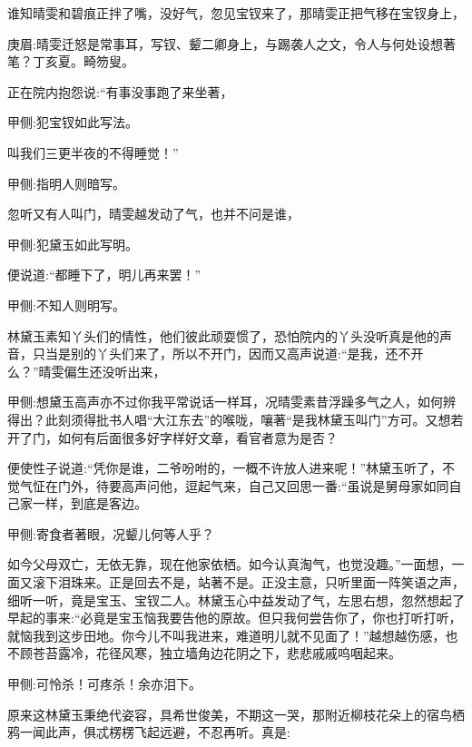 \begin{parag}
    谁知晴雯和碧痕正拌了嘴，没好气，忽见宝钗来了，那晴雯正把气移在宝钗身上，\begin{note}庚眉:晴雯迁怒是常事耳，写钗、颦二卿身上，与踢袭人之文，令人与何处设想著笔？丁亥夏。畸笏叟。\end{note}正在院内抱怨说:“有事没事跑了来坐著，\begin{note}甲侧:犯宝钗如此写法。\end{note}叫我们三更半夜的不得睡觉！”\begin{note}甲侧:指明人则暗写。\end{note}忽听又有人叫门，晴雯越发动了气，也并不问是谁，\begin{note}甲侧:犯黛玉如此写明。\end{note}便说道:“都睡下了，明儿再来罢！”\begin{note}甲侧:不知人则明写。\end{note}林黛玉素知丫头们的情性，他们彼此顽耍惯了，恐怕院内的丫头没听真是他的声音，只当是别的丫头们来了，所以不开门，因而又高声说道:“是我，还不开么？”晴雯偏生还没听出来，\begin{note}甲侧:想黛玉高声亦不过你我平常说话一样耳，况晴雯素昔浮躁多气之人，如何辨得出？此刻须得批书人唱“大江东去”的喉咙，嚷著“是我林黛玉叫门”方可。又想若开了门，如何有后面很多好字样好文章，看官者意为是否？\end{note}便使性子说道:“凭你是谁，二爷吩咐的，一概不许放人进来呢！”林黛玉听了，不觉气怔在门外，待要高声问他，逗起气来，自己又回思一番:“虽说是舅母家如同自己家一样，到底是客边。\begin{note}甲侧:寄食者著眼，况颦儿何等人乎？\end{note}如今父母双亡，无依无靠，现在他家依栖。如今认真淘气，也觉没趣。”一面想，一面又滚下泪珠来。正是回去不是，站著不是。正没主意，只听里面一阵笑语之声，细听一听，竟是宝玉、宝钗二人。林黛玉心中益发动了气，左思右想，忽然想起了早起的事来:“必竟是宝玉恼我要告他的原故。但只我何尝告你了，你也打听打听，就恼我到这步田地。你今儿不叫我进来，难道明儿就不见面了！”越想越伤感，也不顾苍苔露冷，花径风寒，独立墙角边花阴之下，悲悲戚戚呜咽起来。\begin{note}甲侧:可怜杀！可疼杀！余亦泪下。\end{note}
\end{parag}


\begin{parag}
    原来这林黛玉秉绝代姿容，具希世俊美，不期这一哭，那附近柳枝花朵上的宿鸟栖鸦一闻此声，俱忒楞楞飞起远避，不忍再听。真是:
\end{parag}


